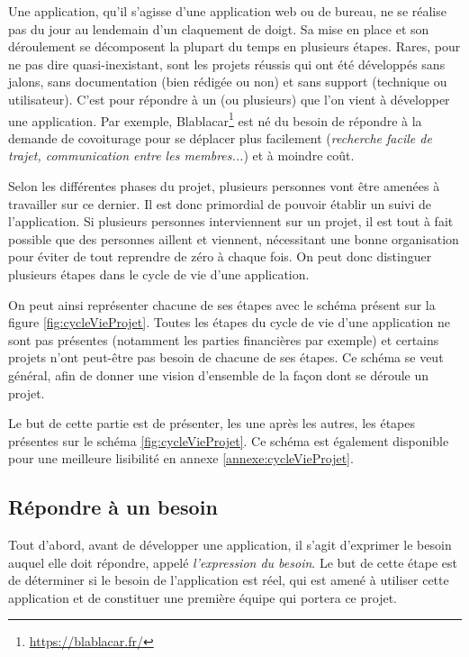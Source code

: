 Une application, qu'il s'agisse d'une application web ou de bureau, ne se réalise pas du jour au lendemain d'un claquement de doigt. Sa mise en place et son déroulement se décomposent la plupart du temps en plusieurs étapes. Rares, pour ne pas dire quasi-inexistant, sont les projets réussis qui ont été développés sans jalons, sans documentation (bien rédigée ou non) et sans support (technique ou utilisateur). C'est pour répondre à un (ou plusieurs) que l'on vient à développer une application. Par exemple, Blablacar\footnote{\url{https://blablacar.fr/}} est né du besoin de répondre à la demande de covoiturage pour se déplacer plus facilement (\emph{recherche facile de trajet, communication entre les membres...}) et à moindre coût.

Selon les différentes phases du projet, plusieurs personnes vont être amenées à travailler sur ce dernier. Il est donc primordial de pouvoir établir un suivi de l'application. Si plusieurs personnes interviennent sur un projet, il est tout à fait possible que des personnes aillent et viennent, nécessitant une bonne organisation pour éviter de tout reprendre de zéro à chaque fois. On peut donc distinguer plusieurs étapes dans le cycle de vie d'une application.

On peut ainsi représenter chacune de ses étapes avec le schéma présent sur la figure \ref{fig:cycleVieProjet}. Toutes les étapes du cycle de vie d'une application ne sont pas présentes (notamment les parties financières par exemple) et certains projets n'ont peut-être pas besoin de chacune de ses étapes. Ce schéma se veut général, afin de donner une vision d'ensemble de la façon dont se déroule un projet.

Le but de cette partie est de présenter, les une après les autres, les étapes présentes sur le schéma \ref{fig:cycleVieProjet}. Ce schéma est également disponible pour une meilleure lisibilité en annexe \ref{annexe:cycleVieProjet}.


\subsection{Répondre à un besoin}

Tout d'abord, avant de développer une application, il s'agit d'exprimer le besoin auquel elle doit répondre, appelé \emph{l'expression du besoin}. Le but de cette étape est de déterminer si le besoin de l'application est réel, qui est amené à utiliser cette application et de constituer une première équipe qui portera ce projet.

